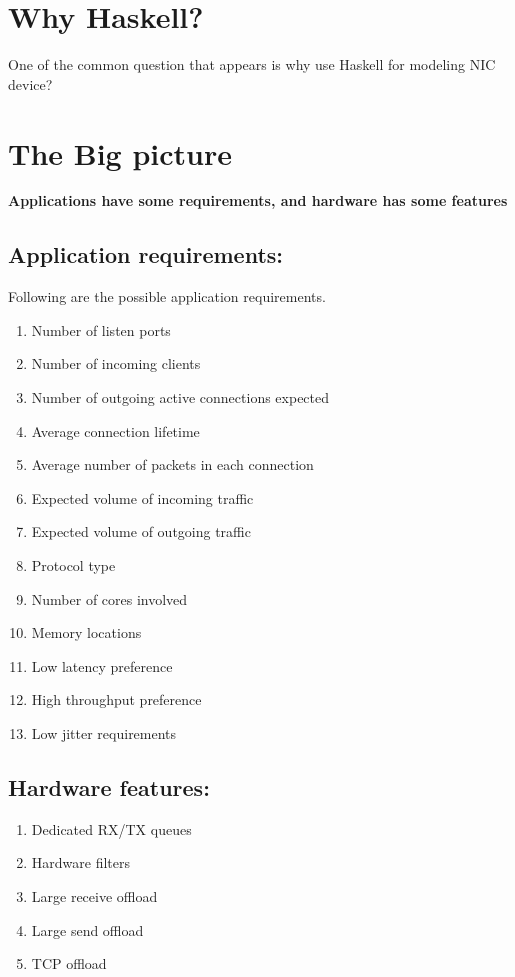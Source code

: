 \section{Why Haskell?}
One of the common question that appears is why use Haskell for modeling NIC
device?

\section{The Big picture}
\textbf{Applications have some requirements, and hardware has some features}

\subsection{Application requirements:}
Following are the possible application requirements.

\begin{enumerate}
    \item Number of listen ports
    \item Number of incoming clients
    \item Number of outgoing active connections expected
    \item Average connection lifetime
    \item Average number of packets in each connection
    \item Expected volume of incoming traffic
    \item Expected volume of outgoing traffic
    \item Protocol type
    \item Number of cores involved
    \item Memory locations
    \item Low latency preference
    \item High throughput preference
    \item Low jitter requirements
\end{enumerate}

\subsection{Hardware features:}
\begin{enumerate}
     \item Dedicated RX/TX queues
     \item Hardware filters
     \item Large receive offload
     \item Large send offload
     \item TCP offload
\end{enumerate}

